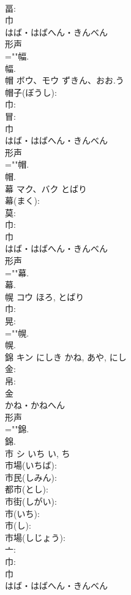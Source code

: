 \documentclass[8pt]{extreport}
\begin{document}
\begin{CJK}{UTF8}{min}
\\	畐: 
\\	巾	
\\	はば・はばへん・きんべん	
\\	形声 
\\	=""幅.
\\	幅.
\\	帽	ボウ、モウ	ずきん、おお.う		
\\	帽子(ぼうし): 
\\	巾: 
\\	冒: 
\\	巾	
\\	はば・はばへん・きんべん	
\\	形声 
\\	=""帽.
\\	帽.
\\	幕	マク、バク	とばり		
\\	幕(まく): 
\\	莫: 
\\	巾: 
\\	巾	
\\	はば・はばへん・きんべん	
\\	形声 
\\	=""幕.
\\	幕.
\\	幌	コウ	ほろ, とばり		
\\	巾: 
\\	晃: 
\\	=""幌.
\\	幌.
\\	錦	キン	にしき	かね, あや, にし	
\\	金: 
\\	帛: 
\\	金	
\\	かね・かねへん	
\\	形声 
\\	=""錦.
\\	錦.
\\	市	シ	いち	い, ち	
\\	市場(いちば): 
\\	市民(しみん): 
\\	都市(とし): 
\\	市街(しがい): 
\\	市(いち): 
\\	市(し): 
\\	市場(しじょう): 
\\	亠: 
\\	巾: 
\\	巾	
\\	はば・はばへん・きんべん	

\end{CJK}
\end{document}
